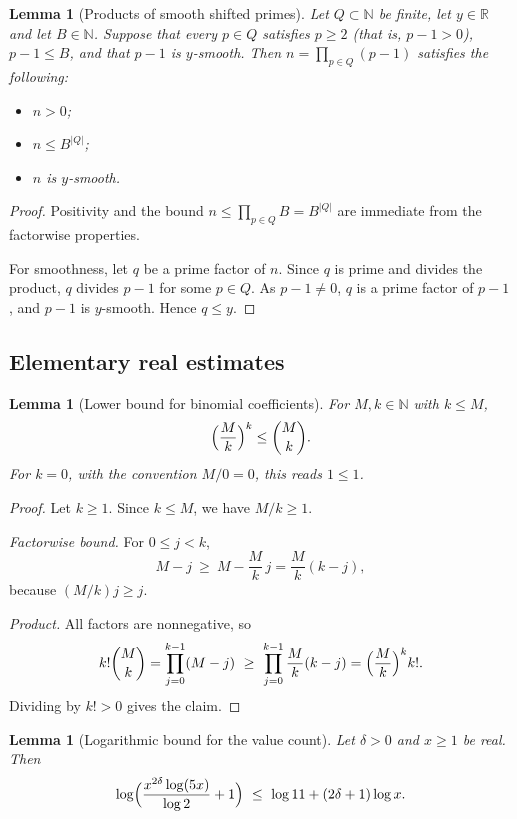 \documentclass[11pt]{article}
\newtheorem{lemma}[theorem]{Lemma}
\theoremstyle{definition}
\theoremstyle{remark}
\begin{document}
\begin{lemma}[Products of smooth shifted primes]\label{lem:prod_smooth_bounded}
Let $Q\subset\mathbb{N}$ be finite, let $y\in\mathbb{R}$ and let $B\in\mathbb{N}$. Suppose that every $p\in Q$ satisfies $p\ge 2$ (that is, $p-1>0$), $p-1\le B$, and that $p-1$ is $y$-smooth. Then $n=\prod_{p\in Q}(p-1)$ satisfies the following:
\begin{itemize}
\item $n>0$;
\item $n\le B^{|Q|}$;
\item $n$ is $y$-smooth.
\end{itemize}
\end{lemma}

\begin{proof}
Positivity and the bound $n\le\prod_{p\in Q}B=B^{|Q|}$ are immediate from the factorwise properties.

For smoothness, let $q$ be a prime factor of $n$. Since $q$ is prime and divides the product, $q$ divides $p-1$ for some $p\in Q$. As $p-1\ne0$, $q$ is a prime factor of $p-1$, and $p-1$ is $y$-smooth. Hence $q\le y$.
\end{proof}

\subsection{Elementary real estimates}

\begin{lemma}[Lower bound for binomial coefficients]\label{lem:choose_ge_pow_div}
For $M,k\in\mathbb{N}$ with $k\le M$,
\[
\Bigl(\frac{M}{k}\Bigr)^{k}\le\binom{M}{k}.
\]
For $k=0$, with the convention $M/0=0$, this reads $1\le1$.
\end{lemma}

\begin{proof}
Let $k\ge1$. Since $k\le M$, we have $M/k\ge1$.

\emph{Factorwise bound.} For $0\le j<k$,
\[
M-j\ \ge\ M-\frac{M}{k}\,j=\frac{M}{k}(k-j),
\]
because $(M/k)j\ge j$.

\emph{Product.} All factors are nonnegative, so
\[
k!\binom{M}{k}=\prod_{j=0}^{k-1}(M-j)\ \ge\ \prod_{j=0}^{k-1}\frac Mk(k-j)=\Bigl(\frac Mk\Bigr)^k k!.
\]
Dividing by $k!>0$ gives the claim.
\end{proof}

\begin{lemma}[Logarithmic bound for the value count]\label{lem:asymp_log_ineq_growth_logbound}
Let $\delta>0$ and $x\ge1$ be real. Then
\[
\log\Bigl(\frac{x^{2\delta}\log(5x)}{\log 2}+1\Bigr)\ \le\ \log 11+(2\delta+1)\log x.
\]
\end{lemma}
\end{document}
